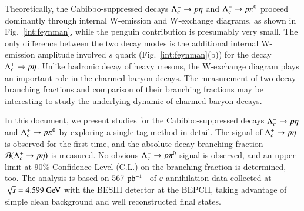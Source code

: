 Theoretically, the Cabibbo-suppressed decays $\Lambda_{c}^{+}\rightarrow p\eta$ and $\Lambda_{c}^{+}\rightarrow p\pi^0$ proceed
dominantly through internal W-emission and W-exchange diagrams, as shown in Fig.~\ref{int:feynman},
while the penguin contribution is presumably very small.
The only difference between the two decay modes is the additional internal W-emission amplitude
involved $s$ quark (Fig.~\ref{int:feynman}(b)) for the decay $\Lambda_{c}^{+}\rightarrow p\eta$.
Unlike hadronic decay of heavy mesons, the W-exchange diagram plays an important role in the charmed
baryon decays.
The measurement of two decay branching fractions and comparison of their branching fractions may be
interesting to study the underlying dynamic of charmed baryon decays.

In this document, we present studies for the Cabibbo-suppressed decays $\Lambda_{c}^{+}\rightarrow p\eta$ and
$\Lambda_{c}^{+}\rightarrow p\pi^0$ by exploring a single tag method in detail.
The signal of $\Lambda_{c}^{+}\rightarrow p\eta$ is observed for the first time, and the absolute
decay branching fraction $\mathcal{B} (\Lambda_{c}^{+}\rightarrow p\eta)$ is measured.
No obvious $\Lambda_{c}^{+}\rightarrow p\pi^0$ signal is observed, and an upper limit at 90\% Confidence Level (C.L.)
on the branching fraction is determined, too.
The analysis is based on 567 $\mbox{pb$^{-1}$}$~\cite{2015MAblikimLumi} of $\ee$ annihilation data collected
at $\sqrt{s}=4.599\gev$ with the BESIII detector at the BEPCII, taking advantage of simple clean
background and well reconstructed final states.

\iffalse
As shown in Figure~\ref{fig:lambc_cs} and Figure~\ref{fig:lambc_cs_bes3}, at the energy of 4.6\,GeV, cross section of producing $\lambdacp\lambdacm$ pair in $\ee$ collisions is $\sigma(\ee\to\lambdacp\lambdacm)=0.38\pm0.13\,\rm{nb}$ measured by BELLE~\cite{Pakhlova:2008vn} and $\sigma(\ee\to\lambdacp\lambdacm)=0.253\pm0.023\,\rm{nb}$ measured by BESIII~\cite{Weiping:lineshape}.\\



\begin{figure*}[h]
\centering
\texttt{[image: bes3\_lineshape.eps]}
\caption{Cross sections of $\ee\to\lambdacp\lambdacm$ measured by BESIII.}
\label{fig:lambc_cs_bes3}
\end{figure*}
\fi

